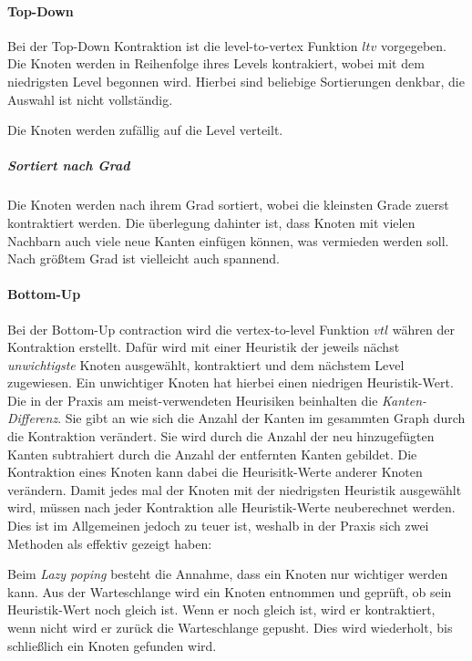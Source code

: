 \paragraph{Top-Down}

Bei der Top-Down Kontraktion ist die level-to-vertex Funktion ${ltv}$ vorgegeben.
Die Knoten werden in Reihenfolge ihres Levels kontrakiert, wobei mit dem niedrigsten Level begonnen wird.
Hierbei sind beliebige Sortierungen denkbar, die Auswahl ist nicht vollständig.


Die Knoten werden zufällig auf die Level verteilt.


\subparagraph{Sortiert nach Grad}
Die Knoten werden nach ihrem Grad sortiert, wobei die kleinsten Grade zuerst kontraktiert werden.
Die überlegung dahinter ist, dass Knoten mit vielen Nachbarn auch viele neue Kanten einfügen können, was vermieden werden soll.
Nach größtem Grad ist vielleicht auch spannend.


\paragraph{Bottom-Up}

Bei der Bottom-Up contraction wird die vertex-to-level Funktion ${vtl}$ währen der Kontraktion erstellt.
Dafür wird mit einer Heuristik der jeweils nächst \emph{unwichtigste} Knoten ausgewählt, kontraktiert und dem nächstem Level zugewiesen.
Ein unwichtiger Knoten hat hierbei einen niedrigen Heuristik-Wert.
Die in der Praxis am meist-verwendeten Heurisiken beinhalten die \emph{Kanten-Differenz}.
Sie gibt an wie sich die Anzahl der Kanten im gesammten Graph durch die Kontraktion verändert.
Sie wird durch die Anzahl der neu hinzugefügten Kanten subtrahiert durch die Anzahl der entfernten Kanten gebildet.
Die Kontraktion eines Knoten kann dabei die Heurisitk-Werte anderer Knoten verändern.
Damit jedes mal der Knoten mit der niedrigsten Heuristik ausgewählt wird, müssen nach jeder Kontraktion alle Heuristik-Werte neuberechnet werden.
Dies ist im Allgemeinen jedoch zu teuer ist, weshalb in der Praxis sich zwei Methoden als effektiv gezeigt haben:

Beim \emph{Lazy poping} besteht die Annahme, dass ein Knoten nur wichtiger werden kann.
Aus der Warteschlange wird ein Knoten entnommen und geprüft, ob sein Heuristik-Wert noch gleich ist.
Wenn er noch gleich ist, wird er kontraktiert, wenn nicht wird er zurück die Warteschlange gepusht.
Dies wird wiederholt, bis schließlich ein Knoten gefunden wird.

